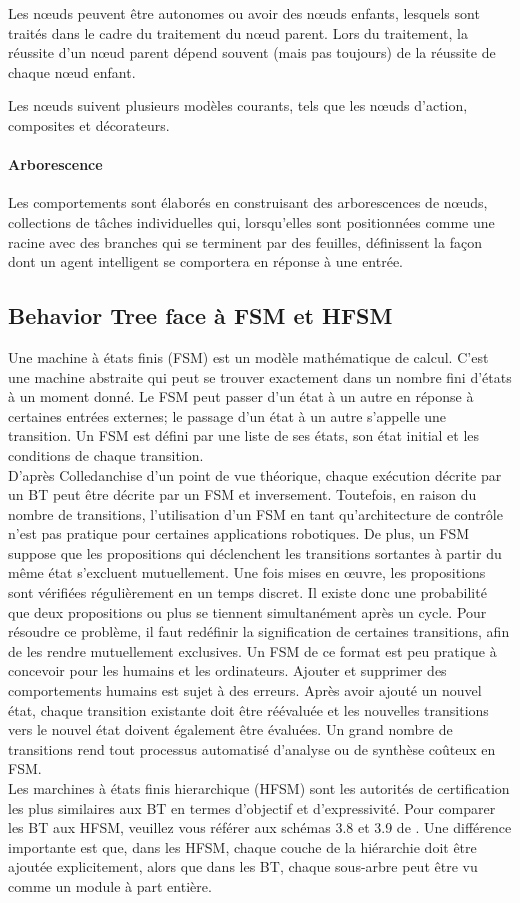 \documentclass[titlepage]{article}
\begin{document}
		Les nœuds peuvent être autonomes ou avoir des nœuds enfants, lesquels sont traités dans le cadre du traitement du nœud parent. Lors du traitement, la réussite d'un nœud parent dépend souvent (mais pas toujours) de la réussite de chaque nœud enfant.
		
		Les nœuds suivent plusieurs modèles courants, tels que les nœuds d'action, composites et décorateurs. \cite{documentation_aws}
		
		\paragraph{Arborescence}
		Les comportements sont élaborés en construisant des arborescences de nœuds, collections de tâches individuelles qui, lorsqu'elles sont positionnées comme une racine avec des branches qui se terminent par des feuilles, définissent la façon dont un agent intelligent se comportera en réponse à une entrée. \cite{documentation_aws}	
		\subsection{Behavior Tree face à FSM et HFSM}
		Une machine à états finis (FSM) est un modèle mathématique de calcul. C'est une machine abstraite qui peut se trouver exactement dans un nombre fini d'états à un moment donné. Le FSM peut passer d'un état à un autre en réponse à certaines entrées externes; le passage d'un état à un autre s'appelle une transition. Un FSM est défini par une liste de ses états, son état initial et les conditions de chaque transition. \cite{wikipedia_FSM}
		\\
		D'après Colledanchise \cite{colledanchise_2017} d'un point de vue théorique, chaque exécution décrite par un BT peut être décrite par un FSM et inversement. Toutefois, en raison du nombre de transitions, l'utilisation d'un FSM en tant qu'architecture de contrôle n'est pas pratique pour certaines applications robotiques. De plus, un FSM suppose que les propositions qui déclenchent les transitions sortantes à partir du même état s’excluent mutuellement. Une fois mises en œuvre, les propositions sont vérifiées régulièrement en un temps discret. Il existe donc une probabilité que deux propositions ou plus se tiennent simultanément après un cycle. Pour résoudre ce problème, il faut redéfinir la signification de certaines transitions, afin de les rendre mutuellement exclusives. Un FSM de ce format est peu pratique à concevoir pour les humains et les ordinateurs. Ajouter et supprimer des comportements humains est sujet à des erreurs. Après avoir ajouté un nouvel état, chaque transition existante doit être réévaluée et les nouvelles transitions vers le nouvel état doivent également être évaluées. Un grand nombre de transitions rend tout processus automatisé d'analyse ou de synthèse coûteux en FSM.
		\\
		Les marchines à états finis hierarchique (HFSM) sont les autorités de certification les plus similaires aux BT en termes d'objectif et d'expressivité. Pour comparer les BT aux HFSM, veuillez vous référer aux schémas 3.8 et 3.9 de \cite{colledanchise_2017}. Une différence importante est que, dans les HFSM, chaque couche de la hiérarchie doit être ajoutée explicitement, alors que dans les BT, chaque sous-arbre peut être vu comme un module à part entière.
\end{document}
